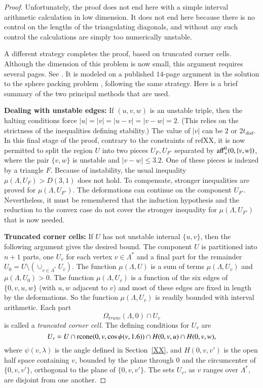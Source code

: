 \begin{proof}
Unfortunately, the proof does not end here with a simple interval
arithmetic calculation in low dimension.  It does not end
here because there is no control on the
lengths of the triangulating diagonals, and without any such
control the calculations are simply too numerically unstable.


A different strategy completes the proof, based on truncated
corner cells.  Although the dimension of this problem is now small,
this argument requires several pages.
See \cite[pp.30-38]{arx}.  It is modeled on a published
$14$-page argument in the solution to the sphere packing problem
\cite[\S\S13.2-13.11]{DCG}, following the same strategy.
Here is a brief summary of the two principal  methods that are used.

\textbf {Dealing with unstable edges:}  
If $(u,v,w)$ is an unstable triple, then the
halting conditions force $|u|=|v|=|u-v|=|v-w|=2$.  (This
relies on the strictness of the inequalities defining stability.)
The value of $|v|$ can be $2$ or $2t_{dod}$. In this final
stage of the proof, contrary to the constraints of refXX,
it is now permitted to split the region $U$ into two pieces
$U_F,U_{F'}$ separated by ${\operatorname{aff}}_+^0(0,\{v,w\})$, where
the pair $\{v,w\}$ is unstable and $|v-w|\le 3.2$.  
One of these pieces is indexed
by a triangle $F$.  Because of instability, the usual inequality
$\mu(\Lambda,U_F)> D(3,1)$ does not hold.  To compensate,
stronger inequalities are proved for $\mu(\Lambda,U_{F'})$.
The deformations can continue on the component $U_{F'}$. Nevertheless,
it must be remembered that the induction hypothesis and the 
reduction to the convex case do not cover the stronger 
inequality for $\mu(\Lambda,U_{F'})$ that is now needed.

\textbf {Truncated corner cells:}  If $U$ has not unstable
internal $\{u,v\}$, then the following argument gives the
desired bound.  The component $U$ is partitioned into $n+1$
parts, one $U_v$ for each vertex $v\in\Lambda^*$ and a final part
for the remainder $U_0 = U\setminus(\cup_{v\in\Lambda^*} U_v)$.
The function $\mu(\Lambda,U)$ is a sum of terms $\mu(\Lambda,U_v)$
and $\mu(\Lambda,U_0) >0$.  The function $\mu(\Lambda,U_v)$
is a function of the six edges of $\{0,v,u,w\}$ (with $u,w$
adjacent to $v$) and most of these edges are fixed in length
by the deformations.  So the function $\mu(\Lambda,U_v)$
is readily bounded with interval arithmetic.  Each part
$$\Omega_{trunc}(\Lambda,0)\cap U_v$$
is called a {\it truncated corner cell}.  The defining conditions
for $U_v$ are
  $$
  U_v = U \cap {\operatorname{rcone}}(0,v,\cos\psi(v,1.6)) \cap H(0,v,u) \cap H(0,v,w),
  $$
where $\psi(v,\lambda)$ is the angle defined in Section~\ref{XX},
and $H(0,v,v')$ is the open half space containing $v$, bounded by
the plane through $0$ and the circumcenter
of $\{0,v,v'\}$, orthogonal to the plane of $\{0,v,v'\}$.  The
sets $U_v$, as $v$ ranges over $\Lambda^*$, are disjoint from one
another.



\end{proof}

